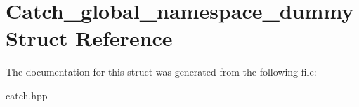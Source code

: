 \hypertarget{struct_catch__global__namespace__dummy}{}\section{Catch\+\_\+global\+\_\+namespace\+\_\+dummy Struct Reference}
\label{struct_catch__global__namespace__dummy}


The documentation for this struct was generated from the following file\+:\begin{DoxyCompactItemize}
\item 
catch.\+hpp\end{DoxyCompactItemize}
